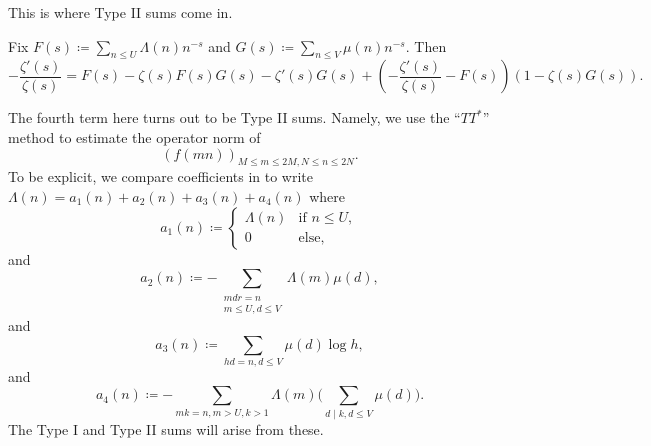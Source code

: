 \documentclass[../notes.tex]{subfiles}
\begin{document}
This is where Type II sums come in.
\begin{proposition} \label{prop:vaughan}
	Fix $F(s)\coloneqq\sum_{n\le U}\Lambda(n)n^{-s}$ and $G(s)\coloneqq\sum_{n\le V}\mu(n)n^{-s}$. Then
	\[-\frac{\zeta'(s)}{\zeta(s)}=F(s)-\zeta(s)F(s)G(s)-\zeta'(s)G(s)+\left(-\frac{\zeta'(s)}{\zeta(s)}-F(s)\right)(1-\zeta(s)G(s)).\]
\end{proposition}
The fourth term here turns out to be Type II sums. Namely, we use the ``$TT^*$'' method to estimate the operator norm of
\[(f(mn))_{M\le m\le 2M,N\le n\le 2N}.\]
To be explicit, we compare coefficients in  to write $\Lambda(n)=a_1(n)+a_2(n)+a_3(n)+a_4(n)$ where
\[a_1(n)\coloneqq\begin{cases}
	\Lambda(n) & \text{if }n\le U, \\
	0 & \text{else},
\end{cases}\]
and
\[a_2(n)\coloneqq-\sum_{\substack{mdr=n\\m\le U,d\le V}}\Lambda(m)\mu(d),\]
and
\[a_3(n)\coloneqq\sum_{hd=n,d\le V}\mu(d)\log h,\]
and
\[a_4(n)\coloneqq-\sum_{mk=n,m>U,k>1}\Lambda(m)\Bigg(\sum_{d\mid k,d\le V}\mu(d)\Bigg).\]
The Type I and Type II sums will arise from these.
\end{document}
